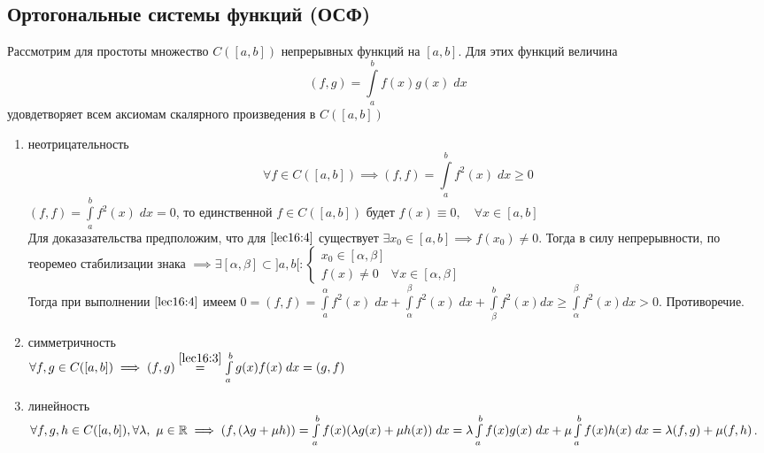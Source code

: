 \documentclass[../../main.tex]{subfiles}
\begin{document}
\begin{lemma}
\begin{lemma}
	 \section{Ортогональные системы функций (ОСФ)}
	 Рассмотрим для простоты множество $C(\left[a, b\right])$ непрерывных функций 
	 на
	  $\left[a, b\right]$. Для этих функций величина
	   \begin{equation}
	 \label{lec16:3}
	 	 (f, g) = \int \limits_a^b f(x)g(x)\; dx
	  \end{equation}
	  удовдетворяет всем аксиомам скалярного произведения в $C(\left[a, 
	  b\right])$
	 \begin{enumerate}
	 \item неотрицательность
	 \begin{equation}
	 \label{lec16:4}
	 \forall f \in C(\left[a, b\right]) \implies (f, f) = \int\limits_a^bf^2(x)\; 
	 dx \ge 0 
	 \end{equation}
	 $(f, f) = \int\limits_a^bf^2(x)\; dx = 0 $, то единственной $f \in 
	 C(\left[a,
	  b\right]) $ будет $f(x) \equiv 0, \quad \forall x \in \left[a, b\right]$\\
	 Для доказазательства предположим, что для $\eqref{lec16:4}$ существует 
	 $\exists
	  x_0 \in \left[a, b\right] \implies f(x_0) \neq 0$. Тогда в силу 
	  непрерывности,
	   по теоремео стабилизации знака $\implies \exists \left[\alpha, \beta 
	   \right]
	    \subset ]a, b [ : \begin{cases}
	 x_0 \in \left[\alpha, \beta \right]\\
	 f(x) \neq 0 \quad \forall x \in \left[\alpha, \beta \right] 
	 \end{cases}$\\
	 Тогда при выполнении $\eqref{lec16:4}$ имеем $0 = (f, f) = 
	 \int\limits_a^\alpha
	  f^2(x)\; dx + \int\limits_\alpha^\beta f^2(x) \; dx + \int\limits_\beta ^b 
	  f^2(x)dx \geq
	   \int\limits_\alpha^\beta f^2(x)dx  > 0$. Противоречие.
	 \item симметричность\\
	 $\forall f, g \in C(\left[a, b\right]) \implies(f, g)
	  \stackrel{\eqref{lec16:3}}{=} \int\limits_a^b g(x)f(x)\; dx = (g, f) $
	 \item линейность\\
	 $\forall f, g, h \in C(\left[a, b\right]), \forall \lambda, \ \mu \in \mathbb{R} 
	 \implies
	  (f, (\lambda g + \mu h)) = \int \limits_a^bf(x) (\lambda g(x) + \mu h(x)) 
	  \; dx =
	   \lambda \int \limits_a^bf(x)g(x)\; dx + \mu \int \limits_a^bf(x)h(x)\; dx 
	   = \lambda(f,
	    g) + \mu (f, h)$.\\

\end{enumerate}
\end{lemma}
\end{lemma}
\end{document}
